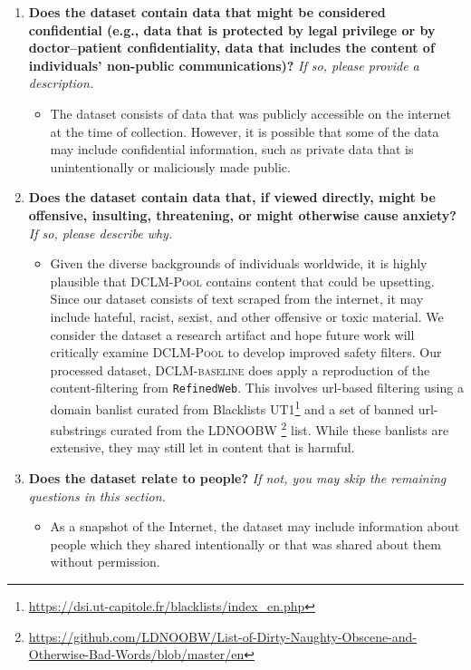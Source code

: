 \documentclass{article}
\newcommand{\rawpool}{\textsc{DCLM-Pool}\xspace}
\newcommand{\hqpool}{\textsc{DCLM-baseline}\xspace}
\newcommand{\rw}{\texttt{RefinedWeb}\xspace}
\begin{document}
\begin{enumerate}[label=Q\arabic*, resume]
\item \textbf{Does the dataset contain data that might be considered confidential (e.g., data that is protected by legal privilege or by doctor–patient confidentiality, data that includes the content of individuals’ non-public communications)?} \textit{If so, please provide a description.}

\begin{itemize}
\item The dataset consists of data that was publicly accessible on the internet at the time of collection. However, it is possible that some of the data may include confidential information, such as private data that is unintentionally or maliciously made public.
\end{itemize}

\item \textbf{Does the dataset contain data that, if viewed directly, might be offensive, insulting, threatening, or might otherwise cause anxiety?} \textit{If so, please describe why.}

\begin{itemize}
\item Given the diverse backgrounds of individuals worldwide, it is highly plausible that \rawpool contains content that could be upsetting. Since our dataset consists of text scraped from the internet, it may include hateful, racist, sexist, and other offensive or toxic material. We consider the dataset a research artifact and hope future work will critically examine \rawpool to develop improved safety filters.
Our processed dataset, \hqpool does apply a reproduction of the content-filtering from \rw. This involves url-based filtering using a domain banlist curated from Blacklists UT1\footnote{\url{https://dsi.ut-capitole.fr/blacklists/index_en.php}} and a set of banned url-substrings curated from the LDNOOBW \footnote{\url{https://github.com/LDNOOBW/List-of-Dirty-Naughty-Obscene-and-Otherwise-Bad-Words/blob/master/en}} list. While these banlists are extensive, they may still let in content that is harmful.
\end{itemize}


\item \textbf{Does the dataset relate to people?} \textit{If not, you may skip the remaining questions in this section.}

\begin{itemize}
\item As a snapshot of the Internet, the dataset may include information about people which they shared intentionally or that was shared about them without permission.
\end{itemize}


\end{enumerate}
\end{document}

